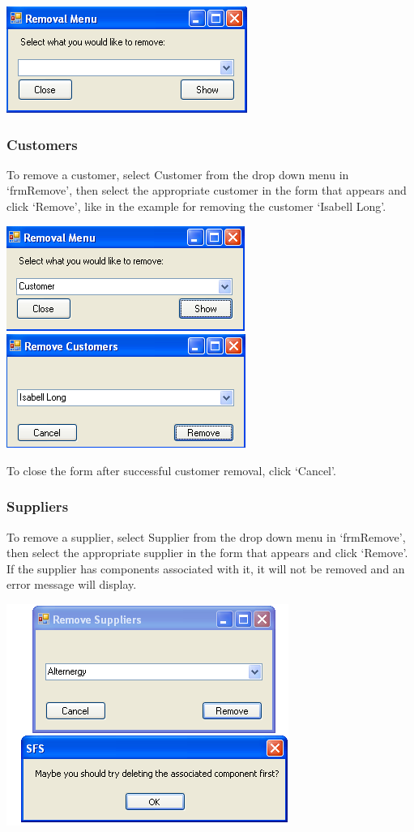 	\includegraphics[scale=0.5]{frmRemove_scrot}
		
		\subsubsection{Customers}
		
		To remove a customer, select Customer from the drop down menu in `frmRemove', then select the appropriate customer in the form that appears and click `Remove', like in the example for removing the customer `Isabell Long'.
	
		\includegraphics[scale=0.5]{customer-frmRemove_scrot}
		\includegraphics[scale=0.5]{customer-frmRemoveCustomer_scrot}
		
		To close the form after successful customer removal, click `Cancel'.
		
		\subsubsection{Suppliers}
		
		To remove a supplier, select Supplier from the drop down menu in `frmRemove', then select the appropriate supplier in the form that appears and click `Remove'.  If the supplier has components associated with it, it will not be removed and an error message will display.
		
		\includegraphics[scale=0.5]{test9dot2}
		
